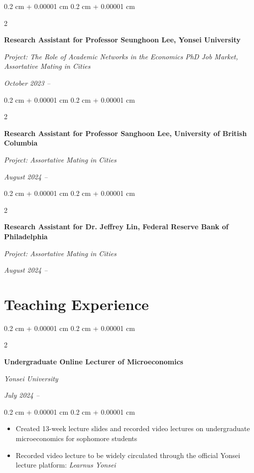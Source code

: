 \documentclass[10pt, letterpaper]{article}
\newenvironment{highlights}{
	\begin{itemize}[
		topsep=0.10 cm,
		parsep=0.10 cm,
		partopsep=0pt,
		itemsep=0pt,
		leftmargin=0.4 cm + 10pt
		]
	}{
	\end{itemize}
} %
\newenvironment{onecolentry}{
	\begin{adjustwidth}{
			0.2 cm + 0.00001 cm
		}{
			0.2 cm + 0.00001 cm
		}
	}{
	\end{adjustwidth}
} %
\newenvironment{twocolentry}[2][]{
	\onecolentry
	\def\secondColumn{#2}
	\setcolumnwidth{\fill, 4.5 cm}
	\begin{paracol}{2}
	}{
		\switchcolumn \raggedleft \secondColumn
	\end{paracol}
	\endonecolentry
} %
\begin{document}
			\begin{twocolentry}{
			\textit{October 2023 –}    
			
			\textit{}}
		\textbf{Research Assistant for Professor Seunghoon Lee, Yonsei University}
		
		\textit{Project: The Role of Academic Networks in the Economics PhD Job Market, Assortative Mating in Cities }
	\end{twocolentry}
	
\vspace{12pt}
				\begin{twocolentry}{
			\textit{August 2024 –}    
			
			\textit{}}
		\textbf{Research Assistant for Professor Sanghoon Lee, University of British Columbia}
		
		\textit{Project: Assortative Mating in Cities}
	\end{twocolentry}
	
\vspace{12pt}

					\begin{twocolentry}{
			\textit{August 2024 –}    
			
			\textit{}}
		\textbf{Research Assistant for Dr. Jeffrey Lin, Federal Reserve Bank of Philadelphia}
		
		\textit{Project: Assortative Mating in Cities}
	\end{twocolentry}
	
	
	
	\section{Teaching Experience}
		\begin{twocolentry}{
			\textit{July 2024 –}    
			
			\textit{}}
		\textbf{Undergraduate Online Lecturer of Microeconomics}
		
		\textit{Yonsei University}
	\end{twocolentry}
	
	\vspace{0.10 cm}
	\begin{onecolentry}
		\begin{highlights}
			\item Created 13-week lecture slides and recorded video lectures on undergraduate microeconomics for sophomore students
			\item Recorded video lecture to be widely circulated through the official Yonsei lecture platform: \textit{Learnus Yonsei}
		\end{highlights}
	\end{onecolentry}
	
\end{document}
